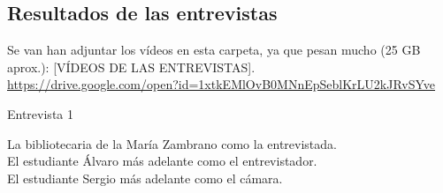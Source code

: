 \documentclass[12pt]{article}
\begin{document}
\subsection{Resultados de las entrevistas}

Se van han adjuntar los vídeos en esta carpeta, ya que pesan mucho (25 GB aprox.): [VÍDEOS DE LAS ENTREVISTAS]. \\
\url{https://drive.google.com/open?id=1xtkEMlOvB0MNnEpSeblKrLU2kJRvSYve}

Entrevista 1

La bibliotecaria de la María Zambrano como la entrevistada.\\ 
El estudiante Álvaro  más adelante como el entrevistador.\\
El estudiante Sergio más adelante como el cámara.\\
	
\end{document}
